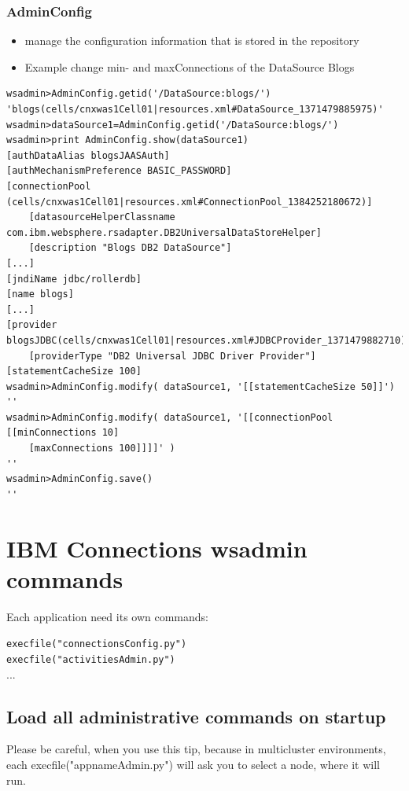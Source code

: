 \documentclass[12pt,a4paper]{article}
\begin{document}
\subsubsection{AdminConfig}
\begin{itemize}
\item manage the configuration information that is stored in the repository
\item Example change min- and maxConnections of the DataSource Blogs
\end{itemize}
\begin{landscape}
\begin{lstlisting}
wsadmin>AdminConfig.getid('/DataSource:blogs/') 
'blogs(cells/cnxwas1Cell01|resources.xml#DataSource_1371479885975)'
wsadmin>dataSource1=AdminConfig.getid('/DataSource:blogs/')
wsadmin>print AdminConfig.show(dataSource1)
[authDataAlias blogsJAASAuth]
[authMechanismPreference BASIC_PASSWORD]
[connectionPool (cells/cnxwas1Cell01|resources.xml#ConnectionPool_1384252180672)] 
    [datasourceHelperClassname com.ibm.websphere.rsadapter.DB2UniversalDataStoreHelper] 
    [description "Blogs DB2 DataSource"]
[...]
[jndiName jdbc/rollerdb]
[name blogs]
[...]
[provider blogsJDBC(cells/cnxwas1Cell01|resources.xml#JDBCProvider_1371479882710)] 
    [providerType "DB2 Universal JDBC Driver Provider"]
[statementCacheSize 100]
wsadmin>AdminConfig.modify( dataSource1, '[[statementCacheSize 50]]')
''
wsadmin>AdminConfig.modify( dataSource1, '[[connectionPool [[minConnections 10]
    [maxConnections 100]]]]' )
''
wsadmin>AdminConfig.save()
''
\end{lstlisting}
\end{landscape}
\section{IBM Connections wsadmin commands}

Each application need its own commands:

\texttt{execfile("connectionsConfig.py")}\\
\texttt{execfile("activitiesAdmin.py")}\\
...

\subsection{Load all administrative commands on startup}

Please be careful, when you use this tip, because in multicluster environments, each execfile("appnameAdmin.py") will ask you to select a node, where it will run.
\end{document}
